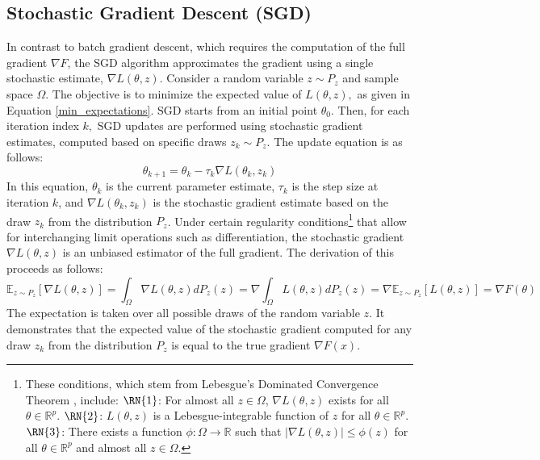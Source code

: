 \subsection{Stochastic Gradient Descent (SGD)}\label{SGD section}
In contrast to batch gradient descent, which requires the computation of the full gradient $\nabla F$, the SGD algorithm approximates the gradient using a single stochastic estimate, $\nabla L(\theta, z)$. Consider a random variable $z\sim P_z$ and sample space $\Omega.$ The objective is to minimize the expected value of $L(\theta, z),$ as given in Equation \eqref{min_expectations}. SGD starts from an initial point $\theta_{0}.$ Then, for each iteration index $k,$ SGD updates are performed using stochastic gradient estimates, computed based on specific draws $z_{k}\sim P_{z}.$ The update equation is as follows:
\begin{equation*}\tag{5.4.1}
\theta_{k+1} = \theta_{k} - \tau_{k} \nabla L(\theta_{k}, z_{k})
\end{equation*}
In this equation, $\theta_{k}$ is the current parameter estimate, $\tau_k$ is the step size at iteration $k$, and $\nabla L(\theta_k, z_k)$ is the stochastic gradient estimate based on the draw $z_k$ from the distribution $P_z$.
Under certain regularity conditions\footnote{These conditions, which stem from Lebesgue's Dominated Convergence Theorem \cite[67]{stein2005real}, include: $\textnormal{\RN{1}}$: For almost all $z \in \Omega$, $\nabla L(\theta, z)$ exists for all $\theta\in\mathbb{R}^{p}$. $\textnormal{\RN{2}}$: $L(\theta, z)$ is a Lebesgue-integrable function of $z$ for all $\theta\in\mathbb{R}^{p}$. $\textnormal{\RN{3}}$: There exists a function $\phi : \Omega \rightarrow \mathbb{R}$ such that $|\nabla L(\theta, z)| \leq \phi(z)$ for all $\theta\in\mathbb{R}^{p}$ and almost all $z \in \Omega$.} that allow for interchanging limit operations such as differentiation, the stochastic gradient $\nabla L(\theta, z)$ is an unbiased estimator of the full gradient. The derivation of this proceeds as follows:
\begin{equation*}\label{gd_unbiased}\tag{5.4.2}
\mathbb{E}_{z \sim P_z}[\nabla L(\theta, z)] = \int_{\Omega}\nabla L(\theta,z)dP_{z}(z) = \nabla\int_{\Omega}L(\theta,z)dP_{z}(z) = \nabla\mathbb{E}_{z \sim P_z}[L(\theta, z)] = \nabla F(\theta)
\end{equation*}
The expectation is taken over all possible draws of the random variable $z.$  It demonstrates that the expected value of the stochastic gradient computed for any draw $z_k$ from the distribution $P_z$ is equal to the true gradient $\nabla F(x)$.
